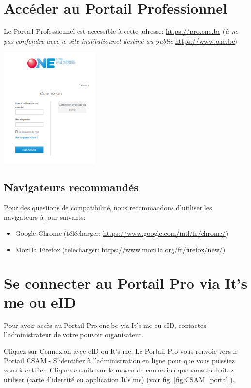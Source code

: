 \section{Accéder au Portail Professionnel}
Le Portail Professionnel est accessible à cette adresse: \url{https://pro.one.be} (\textit{à ne pas confondre avec le site institutionnel destiné au public} \url{https://www.one.be})\\
\centerline{\includegraphics[width=5cm]{Images/intro/connexionPortail.png}}


\subsection{Navigateurs recommandés}
Pour des questions de compatibilité, nous recommandons d'utiliser les navigateurs à jour suivants:
\begin{itemize}
    \item Google Chrome (télécharger: \url{https://www.google.com/intl/fr/chrome/})
    \item Mozilla Firefox (télécharger: \url{https://www.mozilla.org/fr/firefox/new/})
\end{itemize}


\section{Se connecter au Portail Pro via It's me ou eID}
\begin{information}
Pour avoir accès au Portail Pro.one.be via It's me ou eID, contactez l'administrateur de votre pouvoir organisateur.
\end{information}
Cliquez sur Connexion avec eID ou It's me. Le Portail Pro vous renvoie vers le Portail CSAM - S'identifier à l'administration en ligne pour que vous puissiez vous identifier. Cliquez ensuite sur le moyen de connexion que vous souhaitez utiliser (carte d'identité ou application It's me) (voir fig. \ref{fig:CSAM_portal}). 


